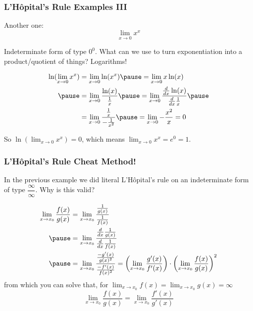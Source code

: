 \documentclass{ltx-talk}
\begin{document}
\begin{frame}
  \frametitle{L'Hôpital's Rule Examples III}
  Another one:
  \begin{equation}
    \lim\limits_{x \rightarrow 0} x^x
  \end{equation} \pause

  Indeterminate form of type \pause $0^0$. \pause What can we use to turn exponentiation into a product/quotient of things? \pause Logarithms! \pause

  \begin{align}
    \ln(\lim_{x \rightarrow 0} x^x) &= \lim_{x \rightarrow 0} \ln(x^x) \pause = \lim_{x \rightarrow 0} x \ln(x) \\ \pause
                                    &= \lim_{x \rightarrow 0} \dfrac{\ln(x)}{\frac{1}{x}} \pause = \lim_{x \rightarrow 0} \dfrac{\frac{d}{dx} \ln(x)}{\frac{d}{dx} \frac{1}{x}} \pause \\
                                    &= \lim_{x \rightarrow 0} \dfrac{\frac{1}{x}}{-\frac{1}{x^2}} \pause = \lim_{x \rightarrow 0}-\frac{x^2}{x} = 0
  \end{align} \pause

  So $\ln(\lim_{x \rightarrow 0} x^x) = 0$, which means \pause $\lim_{x \rightarrow 0} x^x = e^0 = 1$.
\end{frame}

\begin{frame}
  \frametitle{L'Hôpital's Rule Cheat Method!}
  In the previous example we did literal L'Hôpital's rule
  on an indeterminate form of type $\dfrac{\infty}{\infty}$. Why is this valid? \pause

  \begin{align}
    \lim_{x \rightarrow x_0} \dfrac{f(x)}{g(x)} &= \lim_{x \rightarrow x_0} \dfrac{\frac{1}{g(x)}}{\frac{1}{f(x)}} \\ \pause
                                                &= \lim_{x \rightarrow x_0}
                                                \dfrac{\frac{d}{dx} \frac{1}{g(x)}}{\frac{d}{dx}\frac{1}{f(x)}} \\ \pause
                                                &= \lim_{x \rightarrow x_0} \dfrac{\frac{-g'(x)}{g(x)^2}}{\frac{-f'(x)}{f(x)^2}} = \left(\lim_{x \rightarrow x_0} \dfrac{g'(x)}{f'(x)}\right) \cdot \left(\lim_{x \rightarrow x_0} \dfrac{f(x)}{g(x)}\right)^2
  \end{align}
  from which you can solve that, for $\lim_{x \rightarrow x_0} f(x) = \lim_{x \rightarrow x_0} g(x) = \infty$
  \begin{equation}
    \lim_{x \rightarrow x_0} \dfrac{f(x)}{g(x)} = \lim_{x \rightarrow x_0} \dfrac{f'(x)}{g'(x)}
  \end{equation}
\end{frame}
\end{document}
